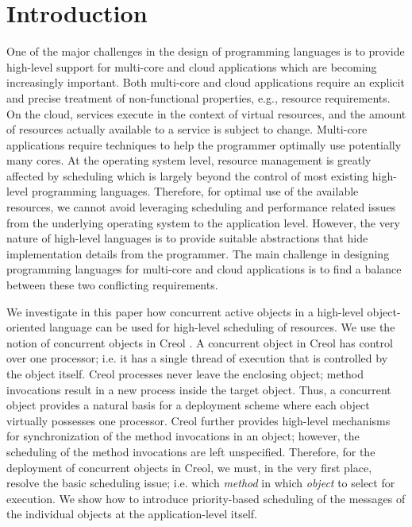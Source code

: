 \section{Introduction} \label{sec:introduction}
One of the major challenges in the design of programming
languages is to provide high-level support for  multi-core and cloud  applications which are becoming increasingly important.
Both multi-core and cloud  applications require an explicit and precise treatment of non-functional properties, e.g., resource requirements.
On the cloud, services execute in the
context of virtual resources, and the amount of resources actually available to a service is subject to change.
Multi-core applications require techniques 
to help the programmer optimally use potentially many cores. At
the operating system level, resource management is greatly affected by scheduling which
is largely beyond the control of most existing high-level programming languages.
Therefore, for optimal use of the available resources, we cannot avoid leveraging
scheduling and performance related issues from the underlying operating system
to the application level. However, the very nature of high-level languages is to
provide suitable abstractions that hide
implementation details from the programmer. The main challenge in designing programming languages
for  multi-core and cloud  applications
is to find a balance between these two conflicting requirements.

We investigate in this paper how concurrent active objects in a high-level object-oriented
language can be used for high-level scheduling of resources. We use the notion of
concurrent objects in Creol \cite{creol:broch_owe,mpd:andrews}. A
concurrent object in Creol has control over one processor; i.e. it has a
single thread of execution that is controlled by the object itself.
Creol processes never leave the enclosing object; method invocations
result in a new process inside the target object.  Thus, a concurrent
object provides a natural basis for a deployment scheme where each
object virtually possesses one processor. Creol further provides high-level
mechanisms for synchronization of the method invocations in an object;
however, the scheduling of the method invocations are left
unspecified. Therefore, for the deployment of concurrent objects in
Creol, we must, in the very first place, resolve the
basic scheduling issue; i.e. which \textit{method} in which
\textit{object} to select for execution.
We show how to introduce priority-based scheduling of the messages of the individual objects
at the application-level itself.


